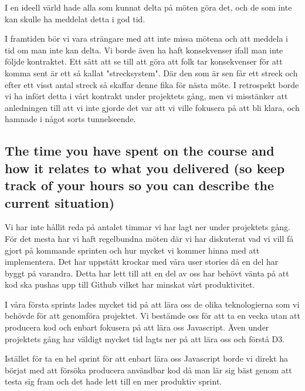 \documentclass{scrartcl}
\begin{document}
I en ideell värld hade alla som kunnat delta på möten göra det, och de som inte kan skulle ha meddelat detta i god tid.

I framtiden bör vi vara strängare med att inte missa mötena och att meddela i tid om man inte kan delta. Vi borde även ha haft konsekvenser ifall man inte följde kontraktet. Ett sätt att se till att göra att folk tar konsekvenser för att komma sent är ett så kallat "strecksystem". Där den som är sen får ett streck och efter ett visst antal streck så skaffar denne fika för nästa möte. I retrospekt borde vi ha infört detta i vårt kontrakt under projektets gång, men vi misstänker att anledningen till att vi inte gjorde det var att vi ville fokusera på att bli klara, och hamnade i något sorts tunnelseende.






\subsection{The time you have spent on the course and how it relates to what you delivered (so keep track of your hours so you can describe the current situation)}

Vi har inte hållit reda på antalet timmar vi har lagt ner under projektets gång. För det mesta har vi haft regelbundna möten där vi har diskuterat vad vi vill få gjort på kommande sprinten och hur mycket vi kommer hinna med att implementera. Det har uppstått krockar med våra user stories då en del har byggt på varandra. Detta har lett till att en del av oss har behövt vänta på att kod ska pushas upp till Github vilket har minskat vårt produktivitet.

I våra första sprints lades mycket tid på att lära oss de olika teknologierna som vi behövde för att genomföra projektet. Vi bestämde oss för att ta en vecka utan att producera kod och enbart fokusera på att lära oss Javascript. Även under projektets gång har väldigt mycket tid lagts ner på att lära oss och förstå D3.

Istället för ta en hel sprint för att enbart lära oss Javascript borde vi direkt ha börjat med att försöka producera användbar kod då man lär sig bäst genom att testa sig fram och det hade lett till en mer produktiv sprint.
\end{document}
